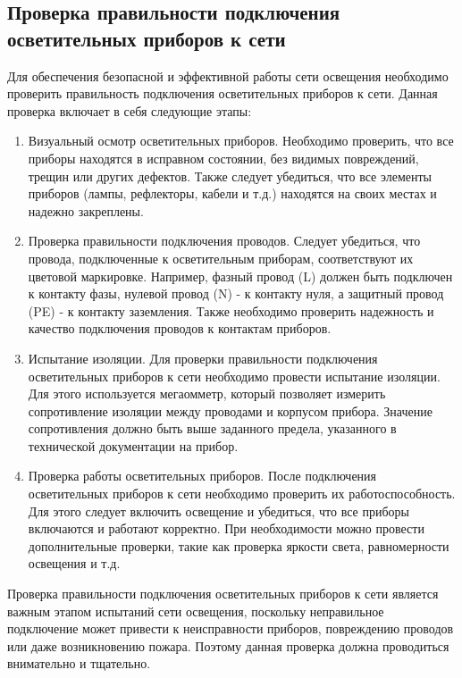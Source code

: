 \documentclass{article}
\begin{document}
\subsection{Проверка правильности подключения осветительных приборов к сети}
Для обеспечения безопасной и эффективной работы сети освещения необходимо проверить правильность подключения осветительных приборов к сети. Данная проверка включает в себя следующие этапы:
\begin{enumerate}
\item Визуальный осмотр осветительных приборов. Необходимо проверить, что все приборы находятся в исправном состоянии, без видимых повреждений, трещин или других дефектов. Также следует убедиться, что все элементы приборов (лампы, рефлекторы, кабели и т.д.) находятся на своих местах и надежно закреплены.
\item Проверка правильности подключения проводов. Следует убедиться, что провода, подключенные к осветительным приборам, соответствуют их цветовой маркировке. Например, фазный провод (L) должен быть подключен к контакту фазы, нулевой провод (N) - к контакту нуля, а защитный провод (PE) - к контакту заземления. Также необходимо проверить надежность и качество подключения проводов к контактам приборов.
\item Испытание изоляции. Для проверки правильности подключения осветительных приборов к сети необходимо провести испытание изоляции. Для этого используется мегаомметр, который позволяет измерить сопротивление изоляции между проводами и корпусом прибора. Значение сопротивления должно быть выше заданного предела, указанного в технической документации на прибор.
\item Проверка работы осветительных приборов. После подключения осветительных приборов к сети необходимо проверить их работоспособность. Для этого следует включить освещение и убедиться, что все приборы включаются и работают корректно. При необходимости можно провести дополнительные проверки, такие как проверка яркости света, равномерности освещения и т.д.
\end{enumerate}
Проверка правильности подключения осветительных приборов к сети является важным этапом испытаний сети освещения, поскольку неправильное подключение может привести к неисправности приборов, повреждению проводов или даже возникновению пожара. Поэтому данная проверка должна проводиться внимательно и тщательно.\\
~\\

\newpage
\end{document}

